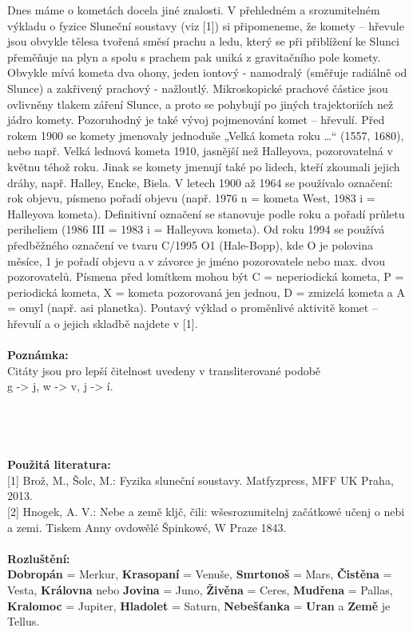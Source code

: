 \documentclass[10pt,a5paper,twoside]{book}
\begin{document}
Dnes máme o kometách docela jiné znalosti. V přehledném a srozumitelném výkladu o fyzice Sluneční soustavy (viz [1]) si připomeneme, že komety – hřevule jsou obvykle tělesa tvořená směsí prachu a ledu, který se při přiblížení ke Slunci přeměňuje na plyn a spolu s prachem pak uniká z gravitačního pole komety. Obvykle mívá kometa dva ohony, jeden iontový - namodralý (směřuje radiálně od Slunce) a zakřivený prachový - nažloutlý. Mikroskopické prachové částice jsou ovlivněny tlakem záření Slunce, a proto se pohybují po jiných trajektoriích než jádro komety. Pozoruhodný je také vývoj pojmenování komet – hřevulí. Před rokem 1900 se komety jmenovaly jednoduše „Velká kometa roku …“ (1557, 1680), nebo např. Velká lednová kometa 1910, jasnější než Halleyova, pozorovatelná v květnu téhož roku. Jinak se komety jmenují také po lidech, kteří zkoumali jejich dráhy, např. Halley, Encke, Biela.  V letech 1900 až 1964 se používalo označení: rok objevu, písmeno pořadí objevu (např. 1976 n = kometa West, 1983 i = Halleyova kometa). Definitivní označení se stanovuje podle roku a pořadí průletu periheliem (1986 III = 1983 i = Halleyova kometa). Od roku 1994 se používá předběžného označení ve tvaru C/1995 O1 (Hale-Bopp), kde O je polovina měsíce, 1 je pořadí objevu a v závorce je jméno pozorovatele nebo max. dvou pozorovatelů. Písmena před lomítkem mohou být C = neperiodická kometa, P = periodická kometa, X = kometa pozorovaná jen jednou, D = zmizelá kometa a A = omyl (např. asi planetka).  Poutavý výklad o proměnlivé aktivitě komet – hřevulí a o jejich skladbě najdete v [1]. \\  \\
\textbf{Poznámka:}\\ Citáty jsou pro lepší čitelnost uvedeny v transliterované podobě \\
g -> j,  w -> v, j -> í. \\ \\ \\ \\  \\
\textbf{Použitá literatura:}\\
{[}1{]} Brož, M., Šolc, M.: Fyzika sluneční soustavy. Matfyzpress, MFF UK Praha, 2013.\\
{[}2{]} Hnogek, A. V.: Nebe a země kljč, čili: wšesrozumitelnj začátkowé učenj o nebi a zemi. Tiskem Anny ovdowělé Špinkowé, W Praze 1843.\\ \\
\textbf{Rozluštění:\\Dobropán} = Merkur,  \textbf{Krasopaní} = Venuše, \textbf{Smrtonoš} = Mars, \textbf{Čistěna} = Vesta, \textbf{Královna} nebo \textbf{Jovina}  =  Juno, \textbf{Živěna} = Ceres, \textbf{Mudřena} = Pallas, \textbf{Kralomoc} = Jupiter, \textbf{Hladolet} = Saturn, \textbf{Nebešťanka} = \textbf{Uran} a \textbf{Země} je Tellus.
\end{document}
